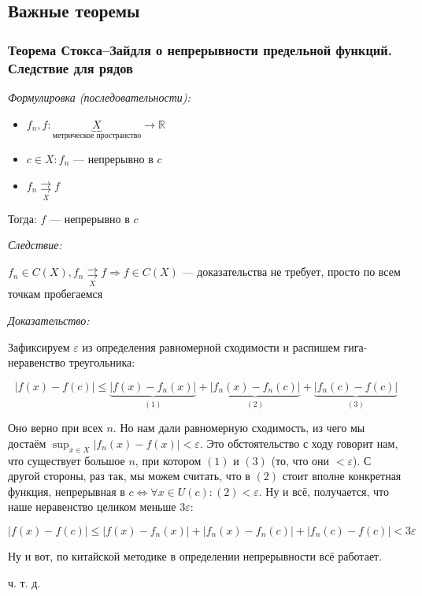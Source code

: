 \documentclass{article}
\def\rsh#1{\underset{#1}{\rightrightarrows}}
\begin{document}
\newpage

\subsection{Важные теоремы}

\subsubsection{Теорема Стокса--Зайдля о непрерывности предельной функций. Следствие для рядов}

\textit{Формулировка (последовательности):}

\begin{itemize}
    \item $f_n, f: \underbrace{X}_{\text{метрическое пространство}} \rightarrow \mathbb{R}$
    \item $c \in X: f_n$ --- непрерывно в $c$  
    \item $f_n \rsh{X} f$
\end{itemize}

Тогда: $f$ --- непрерывно в $c$

\textit{Следствие:}

$f_n \in C(X), f_n \rsh{X} f \Rightarrow f \in C(X)$ --- доказательства не требует, просто по всем точкам пробегаемся

\textit{Доказательство:}

Зафиксируем $\varepsilon$ из определения равномерной сходимости и распишем гига-неравенство треугольника:

\[|f(x) - f(c)| \le \underbrace{|f(x) - f_n(x)|}_{(1)} + \underbrace{|f_n(x) - f_n(c)|}_{(2)} + \underbrace{|f_n(c) - f(c)|}_{(3)}\]

Оно верно при всех $n$. Но нам дали равномерную сходимость, из чего мы достаём $\sup_{x \in X} |f_n(x) - f(x)| < \varepsilon$. Это обстоятельство с ходу говорит нам, что существует большое $n$, при котором $(1)$ и $(3)$ (то, что они $< \varepsilon$). С другой стороны, раз так, мы можем считать, что в $(2)$ стоит вполне конкретная функция, непрерывная в $c \Leftrightarrow \forall x \in U(c): (2) < \varepsilon$. Ну и всё, получается, что наше неравенство целиком меньше $3 \varepsilon$:

\[|f(x) - f(c)| \le |f(x) - f_n(x)| + |f_n(x) - f_n(c)| + |f_n(c) - f(c)| < 3\varepsilon\]

Ну и вот, по китайской методике в определении непрерывности всё работает.

ч. т. д.
\end{document}
